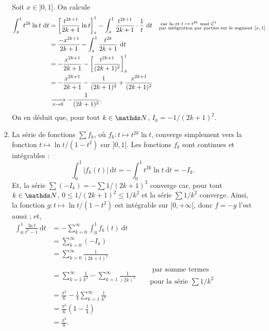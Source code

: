 \documentclass[a4paper]{article}
\begin{document}
\begin{enumerate}
			Soit $x \in {]0,1]}$.
			On calcule
			\begin{align*}
				\int_{x}^{1} t^{2k} \ln t~\mathrm{d}t &= \left[ \frac{t^{2k+1}}{2k+1} \ln t \right]_x^1 - \int_{x}^{1} \frac{t^{2k+1}}{2k+1} \cdot \frac{1}{t}~\mathrm{d}t && \substack{\text{ car $\ln$ et $t \mapsto t^{2k}$ sont $\mathcal{C}^1$}\hfill\null\\\text{par intégration par parties sur le segment $[x,1]$}}\\
				&= \frac{-x^{2k+1}}{2k+1} - \int_{x}^{1} \frac{t^{2k}}{2k+1}~\mathrm{d}t \\
				&= -\frac{x^{2k+1}}{2k+1} - \left[ \frac{t^{2k+1}}{(2k+1)^2} \right]_x^1  \\
				&= -\frac{x^{2k+1}}{2k+1} - \frac{1}{(2k+1)^2} + \frac{x^{2k+1}}{(2k+1)^2} \\
				&\tendsto{x\to 0} -\frac{1}{(2k+1)^2}.
			\end{align*}
			On en déduit que, pour tout $k \in \N$, $I_k = -1 / (2k+1)^2$.
		\item La série de fonctions $\sum f_k$, où $f_k : t \mapsto t^{2k} \ln t$, converge simplement vers la fonction $t \mapsto \ln t / (1 - t^2)$ sur $]0,1[$.
			Les fonctions $f_k$ sont continues et intégrables : \[
				\int_{0}^{1} |f_k(t)|~\mathrm{d}t = -\int_{0}^{1} t^{2k} \ln t~\mathrm{d}t = -I_k
			.\]
			Et, la série $\sum (-I_k) = -\sum 1 / (2k+1)^2$ converge car, pour tout $k \in \N$, $0 \le 1/(2k+1)^2 \le 1 / k^2$ et la série $\sum 1/k^2$ converge.
			Ainsi, la fonction $g : t \mapsto \ln t / (1 - t^2)$ est intégrable sur $]0,+\infty[$, donc $f = -g$ l'est aussi ; et,
			\begin{align*}
				\int_{0}^{1} \frac{\ln t}{t^2 - 1}~\mathrm{d}t &= -\sum_{k=0}^\infty \int_{0}^{1} f_k(t)~\mathrm{d}t\\
				&= \sum_{k=0}^\infty (-I_k)\\
				&= \sum_{k=0}^\infty \frac{1}{(2k+1)^2}\\
				&= \sum_{k=1}^\infty \frac{1}{k^2} - \sum_{k=1}^\infty \frac{1}{(2k)^2} && \substack{\text{ par somme termes pairs/impairs}\\ \text{pour la série $\sum 1 / k^2$ }} \\
				&= \frac{\pi^2}{6} - \frac{1}{4} \sum_{k=1}^\infty \frac{1}{k^2} \\
				&= \frac{\pi^2}{6}\left( 1 - \frac{1}{4} \right)  \\
				&= \frac{\pi^2}{8}. \\
			\end{align*}
	\end{enumerate}
\end{document}
